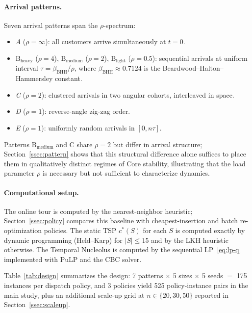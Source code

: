 \documentclass[11pt]{article}
\theoremstyle{plain}
\theoremstyle{definition}
\theoremstyle{remark}
\newcommand{\cstar}{c^{\ast}}
\begin{document}
\paragraph{Arrival patterns.} Seven arrival patterns span the $\rho$-spectrum:
\begin{itemize}
  \item \emph{A} ($\rho=\infty$): all customers arrive simultaneously at $t=0$.
  \item \emph{$\text{B}_{\text{heavy}}$} ($\rho=4$), \emph{$\text{B}_{\text{medium}}$} ($\rho=2$), \emph{$\text{B}_{\text{light}}$} ($\rho=0.5$): sequential arrivals at uniform interval $\tau=\beta_{\mathrm{BHH}}/\rho$, where $\beta_{\mathrm{BHH}}\approx 0.7124$ is the Beardwood--Halton--Hammersley constant.
  \item \emph{C} ($\rho=2$): clustered arrivals in two angular cohorts, interleaved in space.
  \item \emph{D} ($\rho=1$): reverse-angle zig-zag order.
  \item \emph{E} ($\rho=1$): uniformly random arrivals in $[0,n\tau]$.
\end{itemize}
Patterns $\text{B}_{\text{medium}}$ and $\text{C}$ share $\rho=2$ but differ in arrival structure; Section~\ref{ssec:pattern} shows that this structural difference alone suffices to place them in qualitatively distinct regimes of Core stability, illustrating that the load parameter $\rho$ is necessary but not sufficient to characterize dynamics.

\paragraph{Computational setup.} The online tour is computed by the nearest-neighbor heuristic; Section~\ref{ssec:policy} compares this baseline with cheapest-insertion and batch re-optimization policies. The static TSP $\cstar(S)$ for each $S$ is computed exactly by dynamic programming (Held--Karp) for $|S|\le 15$ and by the LKH heuristic \citep{helsgaun2000effective} otherwise. The Temporal Nucleolus is computed by the sequential LP~\eqref{eq:lp-q} implemented with PuLP and the CBC solver.

Table~\ref{tab:design} summarizes the design: 7 patterns $\times$ 5 sizes $\times$ 5 seeds $=$ 175 instances per dispatch policy, and 3 policies yield 525 policy-instance pairs in the main study, plus an additional scale-up grid at $n\in\{20,30,50\}$ reported in Section~\ref{ssec:scaleup}.
\end{document}
